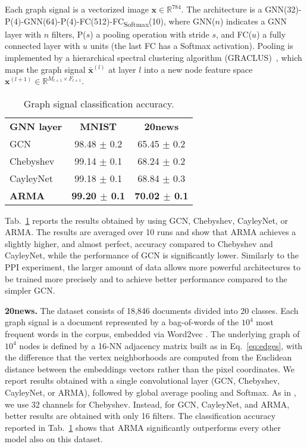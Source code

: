 \documentclass{article}
\def\x{{\mathbf x}}
\begin{document}
Each graph signal is a vectorized image $\x \in \mathbb{R}^{784}$.
The architecture is a GNN(32)-P(4)-GNN(64)-P(4)-FC(512)-FC\textsubscript{Softmax}(10), where GNN($n$) indicates a GNN layer with $n$ filters, P($s$) a pooling operation with stride $s$, and FC($u$) a fully connected layer with $u$ units (the last FC has a Softmax activation).
Pooling is implemented by a hierarchical spectral clustering algorithm (GRACLUS)~\cite{dhillon2007weighted}, which maps the graph signal $\bar{\x}^{(l)}$ at layer $l$ into a new node feature space $\x^{(l+1)} \in \mathbb{R}^{M_{l+1} \times F_{l+1}}$. 


\begin{table}
\caption{Graph signal classification accuracy.}
\setlength\tabcolsep{.7em} \small
\centering
\bgroup
\def\arraystretch{1.0} \begin{tabular}{lcc}
\cmidrule[1.5pt]{1-3}
\textbf{GNN layer} & \textbf{MNIST} & \textbf{20news} \\
\cmidrule[.5pt]{1-3}
GCN             & 98.48 {\tiny$\pm$ 0.2} & 65.45 {\tiny$\pm$ 0.2} \\
Chebyshev       & 99.14 {\tiny$\pm$ 0.1} & 68.24 {\tiny$\pm$ 0.2} \\
CayleyNet       & 99.18 {\tiny$\pm$ 0.1} & 68.84 {\tiny$\pm$ 0.3} \\
\textbf{ARMA}   & \textbf{99.20 {\tiny$\pm$ 0.1}} & \textbf{70.02 {\tiny$\pm$ 0.1}} \\
\cmidrule[1.5pt]{1-3}
\end{tabular}
\label{tab:gsc_res}
\egroup
\end{table}


Tab.~\ref{tab:gsc_res} reports the results obtained by using GCN, Chebyshev, CayleyNet, or ARMA.
The results are averaged over 10 runs and show that ARMA achieves a slightly higher, and almost perfect, accuracy compared to Chebyshev and CayleyNet, while the performance of GCN is significantly lower.
Similarly to the PPI experiment, the larger amount of data allows more powerful architectures to be trained more precisely and to achieve better performance compared to the simpler GCN.

\textbf{20news.}
The dataset consists of 18,846 documents divided into 20 classes.
Each graph signal is a document represented by a bag-of-words of the $10^4$ most frequent words in the corpus, embedded via Word2vec \cite{mikolov2013efficient}. 
The underlying graph of $10^4$ nodes is defined by a 16-NN adjacency matrix built as in Eq.~\eqref{eq:edges}, with the difference that the vertex neighborhoods are computed from the Euclidean distance between the embeddings vectors rather than the pixel coordinates.
We report results obtained with a single convolutional layer (GCN, Chebyshev, CayleyNet, or ARMA), followed by global average pooling and Softmax. 
As in \cite{defferrard2016convolutional}, we use 32 channels for Chebyshev. 
Instead, for GCN, CayleyNet, and ARMA, better results are obtained with only 16 filters.
The classification accuracy reported in Tab.~\ref{tab:gsc_res} shows that ARMA significantly outperforms every other model also on this dataset.
\end{document}
